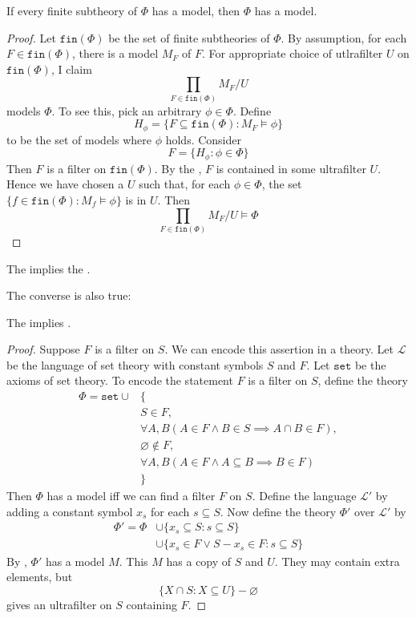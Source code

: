 \documentclass{scrartcl}
\begin{document}
\begin{theorem}\label{th:compactness}
  If every finite subtheory of $\Phi$ has a model, then $\Phi$ has a model. 
\end{theorem}
\begin{proof}
  \newcommand{\finof}{\texttt{fin}}
  Let $\finof(\Phi)$ be the set of finite subtheories of $\Phi$. By assumption, for each $F\in\finof(\Phi)$, there is a model $M_F$ of $F$. 
For appropriate choice of utlrafilter $U$ on $\finof(\Phi)$, I claim
\[
\prod_{F\in\finof(\Phi)} M_F/U
\]
models $\Phi$. To see this, pick an arbitrary $\phi \in \Phi$. Define
\[
H_\phi = \{F\subseteq \finof(\Phi): M_F \models \phi\} 
\]
to be the set of models where $\phi$ holds.
Consider
\[
F = \{ H_\phi : \phi \in \Phi\}
\]
Then $F$ is a filter on $\finof(\Phi)$. By the , $F$ is contained in some ultrafilter $U$. Hence
we have chosen a $U$ such that, for each $\phi \in \Phi$, the set $\{f\in \finof(\Phi): M_f\models \phi\}$ is in $U$. Then
\[
\prod_{F\in\finof(\Phi)} M_F/U \models \Phi
\]
\end{proof}
\begin{cor}
  The  implies the . 
\end{cor}
The converse is also true: 
\begin{theorem}
  The  implies . 
\end{theorem}
\begin{proof}
  \newcommand{\setth}{\texttt{set}}
  Suppose $F$ is a filter on $S$. We can encode this assertion in a theory. Let $\mathcal L$ be the language of set theory with constant symbols $S$ and $F$. Let $\setth$ be the axioms of set theory. To encode the statement $F$ is a filter on $S$, define the theory 
  \begin{align*}
  \Phi = \setth \cup &\bigl\{  \\
    & S \in F, \\
    & \forall A,B ( A\in F \wedge B \in S \implies A \cap B \in F ), \\
    &\varnothing \notin F, \\ 
    &\forall A,B(A\in F \wedge A \subseteq B \implies B \in F) \\
    &\bigr\}
  \end{align*}
  Then $\Phi$ has a model iff we can find a filter $F$ on $S$. Define the language $\mathcal L'$ by adding a constant symbol
  $x_s$ for each $s\subseteq S$. Now define the theory $\Phi'$ over $\mathcal L'$ by
  \begin{align*}
    \Phi' = \Phi&\cup \{x_s \subseteq S : s\subseteq S \} \\
    &\cup \{x_s \in F \vee S-x_s \in F : s \subseteq S\}
  \end{align*}
  By , $\Phi'$ has a model $M$. This $M$ has a copy of $S$ and $U$. They may contain extra elements, but 
  \[
  \{X\cap S : X\subseteq U\} - \varnothing
  \]
  gives an ultrafilter on $S$ containing $F$. 
\end{proof}
\end{document}
